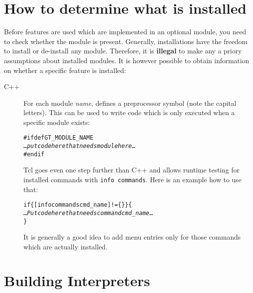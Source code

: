 \documentclass[twoside,fleqn]{report}
\begin{document}
%
%

\section{How to determine what is installed}

Before features are used which are implemented in an optional module, 
you need to check whether the module is present.  Generally, 
\Graphlet{} installations have the freedom to install or de-install 
any module.  Therefore, it is \textbf{illegal} to make any a priory 
assumptions about installed modules.  It is however possible to obtain 
information on whether a specific feature is installed:

\begin{description}

  \item[C++]
  For each module \emph{name}, \Graphlet{} defines a preprocessor 
  symbol  (note the capital letters).  This 
  can be used to write code which is only executed when a specific 
  module exists:
  
\begin{alltt}
#ifdef GT_MODULE_NAME
  \ldots \emph{put code here that needs module  here} \ldots
#endif
\end{alltt}


\item[\GraphScript{}]

  Tcl goes even one step further than C++ and allows runtime testing 
  for installed commands with \texttt{info commands}.  Here is an 
  example how to use that:

\begin{alltt}
if \{ [info commands cmd_name] != \{\} \} \{
  \ldots \emph{Put code here that needs command cmd_name} \ldots
\}
\end{alltt}

  \begin{note}
        It is generally a good idea to add menu entries only for those 
        commands which are actually installed.
  \end{note}

\end{description}



%
%

\section{Building \GraphScript{} Interpreters}
\end{document}
